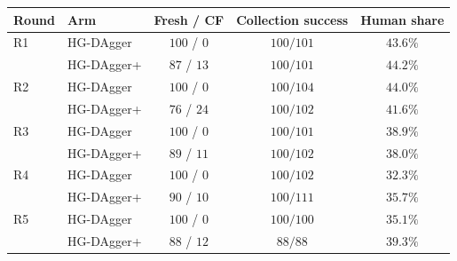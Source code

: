 \begin{tabular}{llccc}
    \hline
    Round & Arm               & Fresh / CF  & Collection success & Human share \\
    \hline
    R1    & HG-DAgger         & $100$ / $0$ & $100/101$          & $43.6\%$    \\
          & HG-DAgger+\ours{} & $87$ / $13$ & $100/101$          & $44.2\%$    \\
    R2    & HG-DAgger         & $100$ / $0$ & $100/104$          & $44.0\%$    \\
          & HG-DAgger+\ours{} & $76$ / $24$ & $100/102$          & $41.6\%$    \\
    R3    & HG-DAgger         & $100$ / $0$ & $100/101$          & $38.9\%$    \\
          & HG-DAgger+\ours{} & $89$ / $11$ & $100/102$          & $38.0\%$    \\
    R4    & HG-DAgger         & $100$ / $0$ & $100/102$          & $32.3\%$    \\
          & HG-DAgger+\ours{} & $90$ / $10$ & $100/111$          & $35.7\%$    \\
    R5    & HG-DAgger         & $100$ / $0$ & $100/100$          & $35.1\%$    \\
          & HG-DAgger+\ours{} & $88$ / $12$ & $88/88$            & $39.3\%$    \\
    \hline
  \end{tabular}
